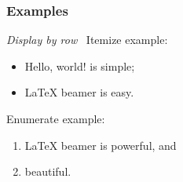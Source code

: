 \documentclass{beamer}
\begin{document}
\begin{frame}\frametitle{Examples}
  \emph{Display by row} \
  Itemize example: \pause
  \begin{itemize}
  \item Hello, world! is simple;  \pause
  \item \LaTeX{} beamer is easy. \pause
  \end{itemize}
  Enumerate example: \pause
  \begin{enumerate}
  \item \LaTeX{} beamer is powerful, and \pause
  \item beautiful. \pause
  \end{enumerate}
\end{frame}
\end{document}
